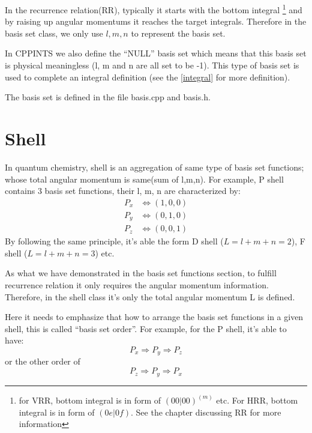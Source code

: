 In the recurrence relation(RR), typically it starts with the bottom integral
\footnote{for VRR, bottom integral is in form of $(00|00)^{(m)}$ etc. For 
HRR, bottom integral is in form of $(0e|0f)$. See the chapter discussing RR 
for more information} and by raising up angular momentums it reaches the target
integrals. Therefore in the basis set class, we only use $l,m,n$ to represent 
the basis set.

In CPPINTS we also define the ``NULL'' basis set which means that 
this basis set is physical meaningless (l, m and n are all set to be -1). 
This type of basis set is used to complete an integral definition (see the 
\ref{integral} for more definition).

The basis set is defined in the file basis.cpp and basis.h.

\section{Shell}
%
%
\label{shell}

In quantum chemistry, shell is an aggregation of same type of basis set
functions; whose total angular momentum is same(sum of l,m,n). For example, 
P shell contains 3 basis set functions, their l, m, n are characterized by:
\begin{align}\label{pshell_example}
	P_{x} &\Leftrightarrow (1,0,0) \nonumber \\
	P_{y} &\Leftrightarrow (0,1,0) \nonumber \\
	P_{z} &\Leftrightarrow (0,0,1)
\end{align}
By following the same principle, it's able the form D shell ($L = l+m+n = 2$), 
F shell ($L = l+m+n = 3$) etc.

As what we have demonstrated in the basis set functions section, to fulfill
recurrence relation it only requires the angular momentum information. 
Therefore, in the shell class it's only the total angular momentum L
is defined.

Here it needs to emphasize that how to arrange the basis set
functions in a given shell, this is called ``basis set order''.
For example, for the P shell, it's able to have:
\begin{equation}
 P_{x} \Rightarrow P_{y} \Rightarrow P_{z}
\end{equation} 
or the other order of 
\begin{equation}
 P_{z} \Rightarrow P_{y} \Rightarrow P_{x}
\end{equation} 

